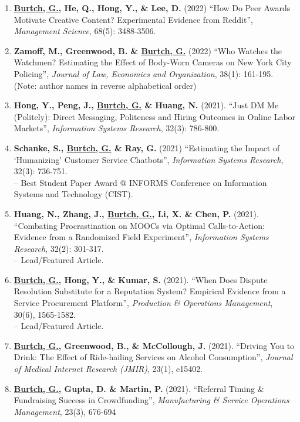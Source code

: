 \documentclass[10.5pt,letterpaper,sans]{moderncv}        %
\begin{document}
\begin{enumerate}[leftmargin=!,labelindent=5pt,itemindent=-15pt]
\item \textbf{\underline{Burtch, G.}, He, Q., Hong, Y., \& Lee, D.} (2022) ``How Do Peer Awards Motivate Creative Content? Experimental Evidence from Reddit'', \textit{Management Science}, 68(5): 3488-3506.

\item \textbf{Zamoff, M., Greenwood, B. \& \underline{Burtch, G.}} (2022) ``Who Watches the Watchmen? Estimating the Effect of Body-Worn Cameras on New York City Policing'', \textit{Journal of Law, Economics and Organization}, 38(1): 161-195. (Note: author names in reverse alphabetical order)

\item \textbf{Hong, Y., Peng, J., \underline{Burtch, G.} \& Huang, N.} (2021). ``Just DM Me (Politely): Direct Messaging, Politeness and Hiring Outcomes in Online Labor Markets'', \textit{Information Systems Research}, 32(3): 786-800.

\item \textbf{Schanke, S., \underline{Burtch, G.} \& Ray, G.} (2021) ``Estimating the Impact of `Humanizing' Customer Service Chatbots'', \textit{Information Systems Research}, 32(3): 736-751. \\-- Best Student Paper Award @ INFORMS Conference on Information Systems and Technology (CIST).

\item \textbf{Huang, N., Zhang, J., \underline{Burtch, G.}, Li, X. \& Chen, P.} (2021). ``Combating Procrastination on MOOCs via Optimal Calls-to-Action: Evidence from a Randomized Field Experiment'', \textit{Information Systems Research},  32(2): 301-317. \\-- Lead/Featured Article.

\item \textbf{\underline{Burtch, G.}, Hong, Y., \& Kumar, S.} (2021). ``When Does Dispute Resolution Substitute for a Reputation System? Empirical Evidence from a Service Procurement Platform'', \textit{Production \& Operations Management}, 30(6), 1565-1582.\\-- Lead/Featured Article.

\item \textbf{\underline{Burtch, G.}, Greenwood, B., \& McCollough, J.} (2021). ``Driving You to Drink: The Effect of Ride-hailing Services on Alcohol Consumption'', \textit{Journal of Medical Internet Research (JMIR)}, 23(1), e15402.

\item \textbf{\underline{Burtch, G.}, Gupta, D. \& Martin, P.} (2021). ``Referral Timing \& Fundraising Success in Crowdfunding'', \textit{Manufacturing \& Service Operations Management}, 23(3), 676-694


\end{enumerate}
\end{document}
